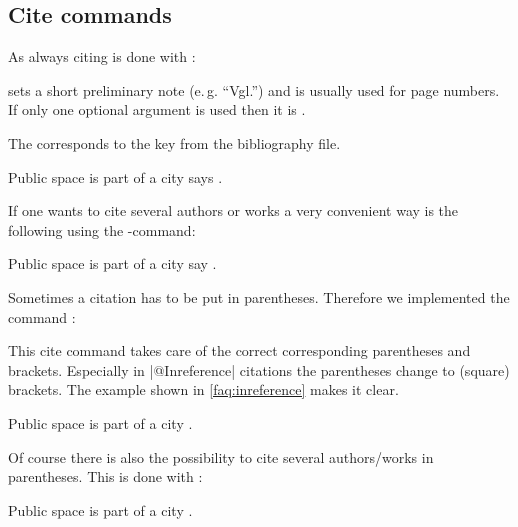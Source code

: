\documentclass[a4paper,
10pt,
greek,
french,
spanish,
italian,
ngerman,
english
]{ltxdoc}
\begin{document}
\subsection{Cite commands}\label{cite-commands}
\DescribeMacro{\cite}
As always citing is done with :

 sets a short preliminary note (e.\,g. \enquote{Vgl.}) and  is usually used for page numbers.
If only one optional argument is used then it is .
The  corresponds to the key from the bibliography file.

\begin{example}
Public space is part of a city says \cite{Osland2016}.
\end{example}
\DescribeMacro{\cites}
If one wants to cite several authors or works a very convenient way is the following using the -command:
\begin{example}
Public space is part of a city say \cites(cf.)(){Osland2016}{Evangelidis2014}.
\end{example}
 
\DescribeMacro{\parencite}
Sometimes a citation has to be put in parentheses. 
Therefore we implemented the command :
This cite command takes care of the correct corresponding parentheses and brackets.
Especially in |@Inreference| citations the parentheses  change to (square) brackets.
The example shown in \cref{faq:inreference} makes it clear.
\begin{example}
Public space is part of a city \parencite{Osland2016}.
\end{example}

\DescribeMacro{\parencites}
Of course there is also the possibility to cite several authors/works in parentheses.
This is done with :
\begin{example}
Public space is part of a city \parencites(cf.)(){Osland2016}{Evangelidis2014}.
\end{example}
\end{document}
